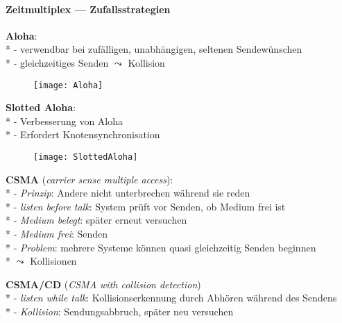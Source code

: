 \paragraph{Zeitmultiplex --- Zufallsstrategien}
\begin{items}
  \item \textbf{Aloha}: \\* 
    - verwendbar bei zufälligen, unabhängigen, seltenen Sendewünschen \\*
    - gleichzeitiges Senden \( \leadsto \) Kollision
  \begin{figure}[H]\centering\label{Aloha}\texttt{[image: Aloha]}\end{figure}
  \item \textbf{Slotted Aloha}: \\*
    - Verbesserung von Aloha \\*
    - Erfordert Knotensynchronisation
    \begin{figure}[H]\centering\label{SlottedAloha}\texttt{[image: SlottedAloha]}\end{figure}
  \item \textbf{CSMA} (\emph{carrier sense multiple access}): \\*
    - \emph{Prinzip}: Andere nicht unterbrechen während sie reden \\*
    - \emph{listen before talk}: System prüft vor Senden, ob Medium frei ist \\*
    - \emph{Medium belegt}: später erneut versuchen \\*
    - \emph{Medium frei}: Senden \\*
    - \emph{Problem}: mehrere Systeme können quasi gleichzeitig Senden beginnen \\* \phantom{-} \phantom{\( \cdot \)} \( \leadsto \) Kollisionen
  \item \textbf{CSMA/CD} (\emph{CSMA with collision detection}) \\*
    - \emph{listen while talk}: Kollisionserkennung durch Abhören während des Sendens \\*
    - \emph{Kollision}: Sendungsabbruch, später neu versuchen
\end{items}

